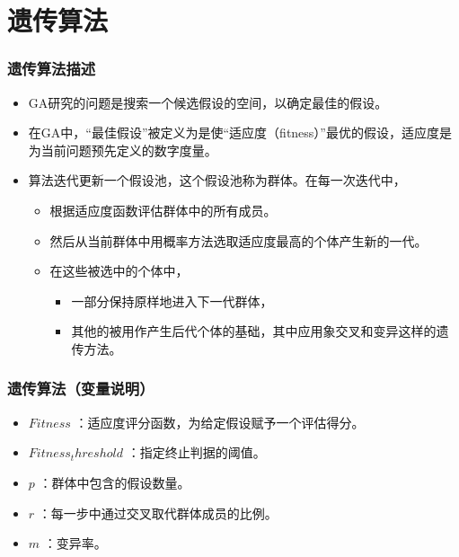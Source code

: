 \documentclass{beamer}
\begin{document}
\section{遗传算法}
\label{sec-3}
\begin{frame}
\frametitle{遗传算法描述}
\label{sec-3-1}

\begin{itemize}
\item GA研究的问题是搜索一个候选假设的空间，以确定最佳的假设。
\item 在GA中，“最佳假设”被定义为是使“适应度（fitness）”最优的假设，适应度是为当前问题预先定义的数字度量。
\item 算法迭代更新一个假设池，这个假设池称为群体。在每一次迭代中，
\begin{itemize}
\item 根据适应度函数评估群体中的所有成员。
\item 然后从当前群体中用概率方法选取适应度最高的个体产生新的一代。
\item 在这些被选中的个体中，
\begin{itemize}
\item 一部分保持原样地进入下一代群体，
\item 其他的被用作产生后代个体的基础，其中应用象交叉和变异这样的遗传方法。
\end{itemize}
\end{itemize}
\end{itemize}
\end{frame}
\begin{frame}
\frametitle{遗传算法（变量说明）}
\label{sec-3-2}

\begin{itemize}
\item $Fitness$ ：适应度评分函数，为给定假设赋予一个评估得分。
\item $Fitness_threshold$ ：指定终止判据的阈值。
\item $p$ ：群体中包含的假设数量。
\item $r$ ：每一步中通过交叉取代群体成员的比例。
\item $m$ ：变异率。
\end{itemize}
\end{frame}
\end{document}

